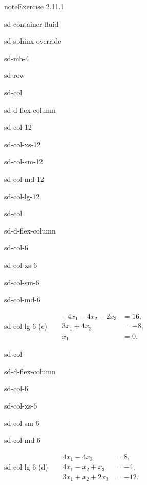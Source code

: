 \documentclass[letterpaper,10pt,english]{jupyterBook}
\begin{document}
\begin{sphinxadmonition}{note}{Exercise 2.11.1}
\begin{sphinxuseclass}{sd-container-fluid}
\begin{sphinxuseclass}{sd-sphinx-override}
\begin{sphinxuseclass}{sd-mb-4}
\begin{sphinxuseclass}{sd-row}
\begin{sphinxuseclass}{sd-col}
\begin{sphinxuseclass}{sd-d-flex-column}
\begin{sphinxuseclass}{sd-col-12}
\begin{sphinxuseclass}{sd-col-xs-12}
\begin{sphinxuseclass}{sd-col-sm-12}
\begin{sphinxuseclass}{sd-col-md-12}
\begin{sphinxuseclass}{sd-col-lg-12}
\end{sphinxuseclass}
\end{sphinxuseclass}
\end{sphinxuseclass}
\end{sphinxuseclass}
\end{sphinxuseclass}
\end{sphinxuseclass}
\end{sphinxuseclass}
\begin{sphinxuseclass}{sd-col}
\begin{sphinxuseclass}{sd-d-flex-column}
\begin{sphinxuseclass}{sd-col-6}
\begin{sphinxuseclass}{sd-col-xs-6}
\begin{sphinxuseclass}{sd-col-sm-6}
\begin{sphinxuseclass}{sd-col-md-6}
\begin{sphinxuseclass}{sd-col-lg-6}
\sphinxAtStartPar
(c)  
\( \begin{align*}
     - 4 x_{1} - 4 x_{2} - 2 x_{3} &= 16, \\
     3 x_{1} + 4 x_{3} &= -8, \\
     x_{1} &= 0.
\end{align*} \)

\end{sphinxuseclass}
\end{sphinxuseclass}
\end{sphinxuseclass}
\end{sphinxuseclass}
\end{sphinxuseclass}
\end{sphinxuseclass}
\end{sphinxuseclass}
\begin{sphinxuseclass}{sd-col}
\begin{sphinxuseclass}{sd-d-flex-column}
\begin{sphinxuseclass}{sd-col-6}
\begin{sphinxuseclass}{sd-col-xs-6}
\begin{sphinxuseclass}{sd-col-sm-6}
\begin{sphinxuseclass}{sd-col-md-6}
\begin{sphinxuseclass}{sd-col-lg-6}
\sphinxAtStartPar
(d)  
\( \begin{align*}
     4 x_{1} - 4 x_{3} &= 8, \\
     4 x_{1} -  x_{2} +  x_{3} &= -4, \\
     3 x_{1} +  x_{2} + 2 x_{3} &= -12.
\end{align*} \)


\end{sphinxuseclass}
\end{sphinxuseclass}
\end{sphinxuseclass}
\end{sphinxuseclass}
\end{sphinxuseclass}
\end{sphinxuseclass}
\end{sphinxuseclass}
\end{sphinxuseclass}
\end{sphinxuseclass}
\end{sphinxuseclass}
\end{sphinxuseclass}
\end{sphinxadmonition}
\end{document}
